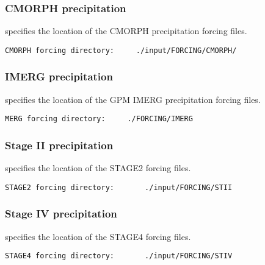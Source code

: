  
 \subsubsection{CMORPH precipitation} \label{sssec:supp_cmorph}
 

 
  specifies the location of the
 CMORPH precipitation forcing files.
 

 \begin{Verbatim}[frame=single]
CMORPH forcing directory:     ./input/FORCING/CMORPH/
 \end{Verbatim}

 
 
 \subsubsection{IMERG precipitation} \label{sssec:supp_imerg}
 

 
  specifies the location of the
 GPM IMERG precipitation forcing files.
 

 \begin{Verbatim}[frame=single]
MERG forcing directory:     ./FORCING/IMERG
 \end{Verbatim}
 

 
 \subsubsection{Stage II precipitation} \label{sssec:supp_stageii}
 

 
  specifies the location of the
 STAGE2 forcing files.
 

 \begin{Verbatim}[frame=single]
STAGE2 forcing directory:       ./input/FORCING/STII
 \end{Verbatim}

 
 \subsubsection{Stage IV precipitation} \label{sssec:supp_stageiv}
 

 
  specifies the location of the
 STAGE4 forcing files.
 

 \begin{Verbatim}[frame=single]
STAGE4 forcing directory:       ./input/FORCING/STIV
 \end{Verbatim}

